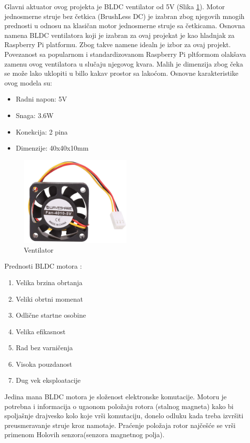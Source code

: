 \documentclass[a4paper, 12pt]{article}
\begin{document}
	\vspace{10pt}
	
\begingroup
	
	Glavni aktuator ovog projekta je BLDC ventilator od 5V (Slika \ref{fig:DC40mm5V}). Motor jednosmerne struje bez četkica (BrushLess DC) je izabran zbog njegovih mnogih prednosti u odnosu na klasičan motor jednosmerne struje sa četkicama. Osnovna namena BLDC ventilatora koji je izabran za ovaj projekat je kao hladnjak za Raspberry Pi platformu. Zbog takve namene idealn je izbor za ovaj projekt. Povezanost sa popularnom i standardizovanom Raspberry Pi pltformom olakšava zamenu ovog ventilatora u slučaju njegovog kvara.  Malih je dimenzija zbog čeka se može lako uklopiti u billo kakav prostor sa lakoćom. Osnovne karakteristike ovog modela su: 

\begin{itemize}
	\item Radni napon: 5V
	\item Snaga: 3.6W
	\item Konekcija: 2 pina
	\item Dimenzije: 40x40x10mm
\end{itemize}

\begin{figure}
\centering
\includegraphics[width=0.5\textwidth]{images/DC40mm5V} 
\caption{Ventilator} \label{fig:DC40mm5V}
\end{figure}

\vspace{10pt}

Prednosti BLDC motora : 
\begin{enumerate}
	\item Velika brzina obrtanja 
	\item Veliki obrtni momenat 
	\item Odlične startne osobine 
	\item Velika efikasnost 
	\item Rad bez varničenja  
	\item Visoka pouzdanost  
	\item Dug vek eksploatacije
\end{enumerate}
\endgroup
\pagebreak
Jedina mana BLDC motora je složenost elektronske komutacije. Motoru je potrebna i informacija o ugaonom položaju rotora (stalnog magneta) kako bi spoljašnje drajvesko kolo koje vrši komutaciju, donelo odluku kada treba izvršiti preusmeravanje struje kroz namotaje. Praćenje položaja rotor najčešće se vrši primenom Holovih senzora(senzora magnetnog polja).
\end{document}

